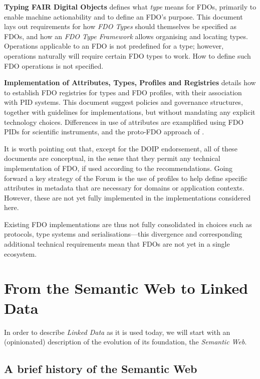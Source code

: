 \textbf{Typing FAIR Digital Objects} \cite{Lannom 2022c} defines what \emph{type} means for FDOs, primarily to enable machine actionability and to define an FDO's purpose. This document lays out requirements for how \emph{FDO Types} should themselves be specified as FDOs, and how an \emph{FDO Type Framework} allows organising and locating types. Operations applicable to an FDO is not predefined for a type; however, operations naturally will require certain FDO types to work. How to define such FDO operations is not specified.

\textbf{Implementation of Attributes, Types, Profiles and Registries} \cite{Blanchi 2023} details how to establish FDO registries for types and FDO profiles, with their association with PID systems. This document suggest policies and governance structures, together with guidelines for implementations, but without mandating any explicit technology choices. Differences in use of attributes are examplified using FDO PIDs for scientific instruments, and the proto-FDO approach of  \cite{Schwardmann 2022b}.

It is worth pointing out that, except for the DOIP endorsement, all of these documents are conceptual, in the sense that they permit any technical implementation of FDO, if used according to the recommendations. 
Going forward a key strategy of the Forum is the use of proﬁles to help deﬁne speciﬁc attributes in metadata that are necessary for domains or application contexts. However, these are not yet fully
implemented in the implementations considered here.

Existing FDO implementations \cite{Wittenburg 2022a} are thus not fully consolidated in choices such as protocols, type systems and serialisations---this divergence and corresponding additional technical requirements mean that FDOs are not yet in a single ecosystem.

\clearpage
\section{From the Semantic Web to Linked Data}\label{ch3:ld}

In order to describe \emph{Linked Data} as it is used today, we will start with an (opinionated) description of the evolution of its foundation, the \emph{Semantic Web}.

\subsection{A brief history of the Semantic Web}\label{ch3:semweb}

